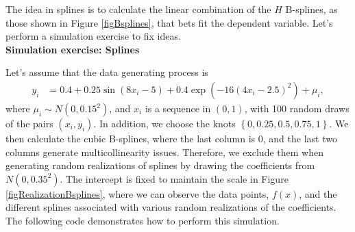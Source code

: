 The idea in splines is to calculate the linear combination of the $H$ B-splines, as those shown in Figure \ref{figBsplines}, that bets fit the dependent variable. Let's perform a simulation exercise to fix ideas.\\

\textbf{Simulation exercise: Splines}

Let's assume that the data generating process is
\begin{align*}
	y_i & = 0.4 + 0.25\sin(8x_i - 5) + 0.4\exp(-16(4x_i - 2.5)^2) + \mu_i,
\end{align*}
where $\mu_i \sim N(0,0.15^2)$, and $x_i$ is a sequence in $(0,1)$, with 100 random draws of the pairs $(x_i, y_i)$. In addition, we choose the knots $\left\{0, 0.25, 0.5, 0.75, 1\right\}$. We then calculate the cubic B-splines, where the last column is 0, and the last two columns generate multicollinearity issues. Therefore, we exclude them when generating random realizations of splines by drawing the coefficients from $N(0, 0.35^2)$. The intercept is fixed to maintain the scale in Figure \ref{figRealizationBsplines}, where we can observe the data points, $f(x)$, and the different splines associated with various random realizations of the coefficients. The following code demonstrates how to perform this simulation.

